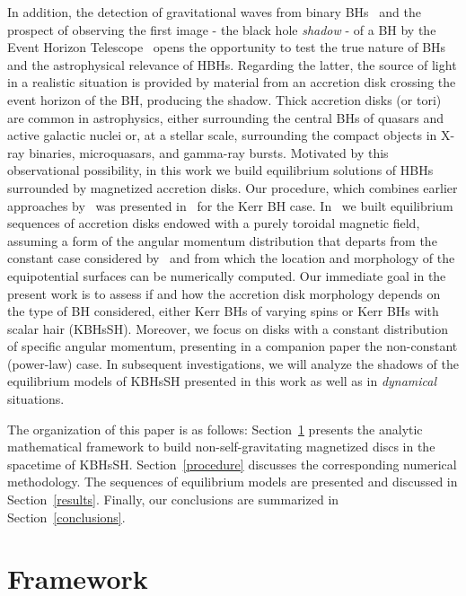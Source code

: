 \documentclass[twocolumn,aps,showpacs,showkeys,prd,superscriptaddress,byrevtex, amsmath]{revtex4-1}
\begin{document}
In addition, the detection of gravitational waves from binary BHs~\cite{Abbott2016, Abbott:2016nmj, Abbott:2017vtc, Abbott:2017oio, Abbott:2017gyy} and the prospect of observing the first image - the black hole {\it shadow} - of a BH by the Event Horizon Telescope~\cite{Fish:2016} opens the opportunity to test the true nature of BHs and the astrophysical relevance of HBHs. 
Regarding the latter, the source of light in a realistic situation is provided by material from an accretion disk crossing the event horizon of the BH, producing the shadow. Thick accretion disks (or tori) are common in astrophysics, either surrounding the central BHs of quasars and active galactic nuclei or, at a stellar scale, surrounding the compact objects in X-ray binaries, microquasars, and gamma-ray bursts. Motivated by this observational possibility, in this work we build equilibrium solutions of HBHs surrounded by magnetized accretion disks. Our procedure, which combines earlier approaches  
by~\cite{Komissarov:2006,Qian:2009} was presented in~\cite{Gimeno-Soler:2017} for the Kerr BH case. In~\cite{Gimeno-Soler:2017} we built equilibrium sequences of accretion disks  endowed with a purely toroidal magnetic field, assuming a form of the angular momentum distribution that departs from the constant case considered by~\cite{Komissarov:2006} and from which the location and morphology of the equipotential surfaces can be numerically computed. Our immediate goal in the present work is to assess if and how the accretion disk morphology depends on the type of BH considered, either Kerr BHs of varying spins or Kerr BHs with scalar hair (KBHsSH). Moreover, we focus on disks with a constant distribution of specific angular momentum, presenting in a companion paper the non-constant (power-law) case. In subsequent investigations, we will analyze the shadows of the equilibrium models of KBHsSH presented in this work as well as in {\it dynamical} situations.

The organization of this paper is as follows: Section~\ref{framework} presents  the  analytic  mathematical framework to build non-self-gravitating magnetized discs in the spacetime of KBHsSH. Section~\ref{procedure} discusses the corresponding numerical methodology. The sequences of equilibrium models are presented and  discussed in Section~\ref{results}. Finally, our conclusions  are  summarized  in  Section~\ref{conclusions}.  
 


\section{Framework}
\label{framework}
\end{document}
